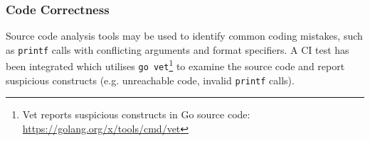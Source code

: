 
\subsubsection{Code Correctness}

Source code analysis tools may be used to identify common coding mistakes, such as \texttt{printf} calls with conflicting arguments and format specifiers. A CI test has been integrated which utilises \texttt{go vet}\footnote{Vet reports suspicious constructs in Go source code: \url{https://golang.org/x/tools/cmd/vet}} to examine the source code and report suspicious constructs (e.g. unreachable code, invalid \texttt{printf} calls).
